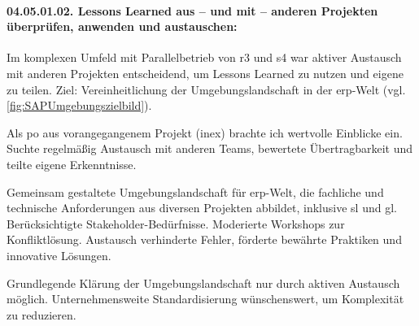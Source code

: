 \paragraph*{04.05.01.02. Lessons Learned aus – und mit – anderen Projekten überprüfen, anwenden und austauschen:}
\label{para:04.05.01.02_LessonsLearnedAusUndMitAnderenProjektenÜberprüfenAnwendenUndAustauschen}

\par Im komplexen Umfeld mit Parallelbetrieb von \gls{r3} und \gls{s4} war aktiver Austausch mit anderen Projekten entscheidend, um Lessons Learned zu nutzen und eigene zu teilen. Ziel: Vereinheitlichung der Umgebungslandschaft in der \gls{erp}-Welt (vgl. \autoref{fig:SAPUmgebungszielbild}).

\par Als \gls{po} aus vorangegangenem Projekt (\gls{inex}) brachte ich wertvolle Einblicke ein. Suchte regelmäßig Austausch mit anderen Teams, bewertete Übertragbarkeit und teilte eigene Erkenntnisse.

\par Gemeinsam gestaltete Umgebungslandschaft für \gls{erp}-Welt, die fachliche und technische Anforderungen aus diversen Projekten abbildet, inklusive \gls{sl} und \gls{gl}. Berücksichtigte Stakeholder-Bedürfnisse. Moderierte Workshops zur Konfliktlösung. Austausch verhinderte Fehler, förderte bewährte Praktiken und innovative Lösungen.

\par Grundlegende Klärung der Umgebungslandschaft nur durch aktiven Austausch möglich. Unternehmensweite Standardisierung wünschenswert, um Komplexität zu reduzieren.